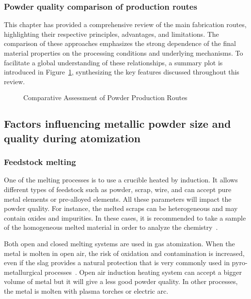 \documentclass[../main]{subfiles}
\begin{document}
\subsubsection{Powder quality comparison of production routes}


This chapter has provided a comprehensive review of the main fabrication routes, highlighting their respective principles, advantages, and limitations. The comparison of these approaches emphasizes the strong dependence of the final material properties on the processing conditions and underlying mechanisms. To facilitate a global understanding of these relationships, a summary plot is introduced in Figure~\ref{f:production_routes}, synthesizing the key features discussed throughout this review.

\vspace{0mm}
\begin{figure}[H]
    \centering
        
        \caption{Comparative Assessment of Powder Production Routes}
        \label{f:production_routes}
\end{figure}
\FloatBarrier
\vspace{0mm}




\subsection{Factors influencing metallic powder size and quality during atomization}

\subsubsection{Feedstock melting}

One of the melting processes is to use a crucible heated by induction. It allows different types of feedstock such as powder, scrap, wire, and can accept pure metal elements or pre-alloyed elements. All these parameters will impact the powder quality. For instance, the melted scraps can be heterogeneous and may contain oxides and impurities. In these cases, it is recommended to take a sample of the homogeneous melted material in order to analyze the chemistry~\cite{Kassym2020AtomizationProcesses}.

Both open and closed melting systems are used in gas atomization. When the metal is molten in open air, the risk of oxidation and contamination is increased, even if the slag provides a natural protection that is very commonly used in pyro-metallurgical processes~\cite{Holappa2016SlagFormation}. Open air induction heating system can accept a bigger volume of metal but it will give a less good powder quality. In other processes, the metal is molten with plasma torches or electric arc.
\end{document}
